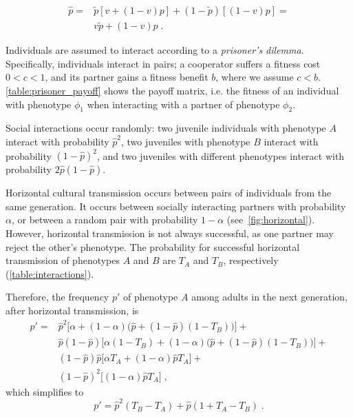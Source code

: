 \documentclass[12pt]{extarticle}
\begin{document}
\begin{equation}\label{eq:horizontal}
\begin{aligned}
\hat{p} =
& \tilde{p} [v + (1-v)p] + (1-\tilde{p}) [(1-v)p] = \\
& v \tilde{p} + (1-v) p \;.
\end{aligned}
\end{equation}

Individuals are assumed to interact according to a \emph{prisoner's dilemma}.
Specifically, individuals interact in pairs; a cooperator suffers a fitness cost $0<c<1$, and its partner gains a fitness benefit $b$, where we assume $c<b$. \autoref{table:prisoner_payoff} shows the payoff matrix, i.e. the fitness of an individual with phenotype $\phi_1$ when interacting with a partner of phenotype $\phi_2$.

Social interactions occur randomly:
two juvenile individuals with phenotype $A$ interact with probability $\hat{p}^2$, two juveniles with phenotype $B$ interact with probability $(1-\hat{p})^2$, and two juveniles with different phenotypes interact with probability $2\hat{p}(1-\hat{p})$. 

Horizontal cultural transmission occurs between pairs of individuals from the same generation. 
It occurs between socially interacting partners with probability $\alpha$, or between a random pair with probability $1-\alpha$ (see~\autoref{fig:horizontal}).
However, horizontal transmission is not always successful, as one partner may reject the other's phenotype. The probability for successful horizontal transmission of phenotypes $A$ and $B$ are $T_A$ and $T_B$, respectively (\autoref{table:interactions}).

Therefore, the frequency $p'$ of phenotype $A$ among adults in the next generation, after horizontal transmission, is 
\begin{equation}\label{eq:nextgen_adults}
\begin{aligned}
p' = 
& \hat{p}^2 \big[\alpha + (1-\alpha)\big(\hat{p} + (1-\hat{p})(1-T_B)\big)\big] + \\
& \hat{p}(1-\hat{p}) \big[\alpha(1-T_B) + (1-\alpha)\big(\hat{p} + (1-\hat{p})(1-T_B)\big)\big] + \\
& (1-\hat{p})\hat{p} \big[\alpha T_A + (1-\alpha) \hat{p} T_A \big] + \\
& (1-\hat{p})^2 \big[(1-\alpha) \hat{p} T_A \big] \;,
\end{aligned}
\end{equation}
which simplifies to
\begin{equation}\label{eq:nextgen_adults_slimpify}
p' = \hat{p}^2(T_B-T_A) + \hat{p}(1+T_A-T_B) \;.
\end{equation}
\end{document}

